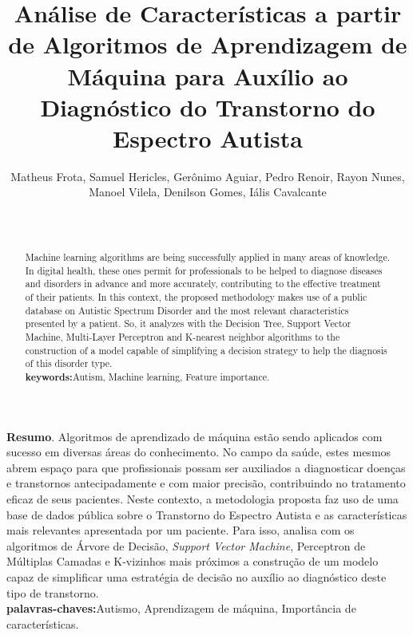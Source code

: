 \documentclass{template/sig-alternate-05-2015}
\makeatletter
\newenvironment{otherlangabstract}{\Collect@Body\@saveaotherbstract}{}
\makeatother
\begin{document}

\title{Análise de Características a partir de Algoritmos de
  Aprendizagem de Máquina para Auxílio ao Diagnóstico do Transtorno do
  Espectro Autista}

 \author{
  \alignauthor Matheus Frota, Samuel
  Hericles, Gerônimo Aguiar, Pedro Renoir, Rayon Nunes, Manoel Vilela,
  Denilson Gomes, Iális Cavalcante
  \\
  \\
  \\
}

\maketitle
\begin{abstract}

  Machine learning algorithms are being successfully applied in many
areas of knowledge. In digital health, these ones permit for
professionals to be helped to diagnose diseases and disorders in
advance and more accurately, contributing to the effective treatment
of their patients. In this context, the proposed methodology makes use
of a public database on Autistic Spectrum Disorder and the most
relevant characteristics presented by a patient. So, it analyzes with
the Decision Tree, Support Vector Machine, Multi-Layer Perceptron and
K-nearest neighbor algorithms to the construction of a model capable
of simplifying a decision strategy to help the diagnosis of this
disorder type.\\
  \textbf{keywords:}{Autism, Machine learning, Feature importance.}\\

\end{abstract}

\begin{otherlangabstract}
  \textbf{Resumo}.
  Algoritmos de aprendizado de máquina estão sendo
aplicados com sucesso em diversas áreas do conhecimento. No campo da
saúde, estes mesmos abrem espaço para que profissionais possam ser
auxiliados a diagnosticar doenças e transtornos antecipadamente e com
maior precisão, contribuindo no tratamento eficaz de seus
pacientes. Neste contexto, a metodologia proposta faz uso de uma base
de dados pública sobre o Transtorno do Espectro Autista e as
características mais relevantes apresentada por um paciente. Para
isso, analisa com os algoritmos de Árvore de Decisão, \textit{Support
Vector Machine}, Perceptron de Múltiplas Camadas e K-vizinhos mais
próximos a construção de um modelo capaz de simplificar uma estratégia
de decisão no auxílio ao diagnóstico deste tipo de transtorno.\\
  \textbf{palavras-chaves:}{Autismo, Aprendizagem de máquina,
    Importância de características.}
\end{otherlangabstract}
\end{document}
